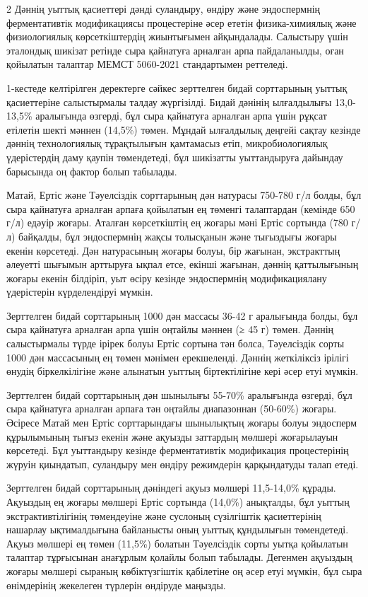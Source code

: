 \begin{multicols}{2}
Дәннің уыттық қасиеттері дәнді суландыру, өндіру және эндоспермнің
ферментативтік модификациясы процестеріне әсер ететін физика-химиялық
және физиологиялық көрсеткіштердің жиынтығымен айқындалады. Салыстыру
үшін эталондық шикізат ретінде сыра қайнатуға арналған арпа
пайдаланылды, оған қойылатын талаптар МЕМСТ 5060-2021 стандартымен
реттеледі.

1-кестеде келтірілген деректерге сәйкес зерттелген бидай сорттарының
уыттық қасиеттеріне салыстырмалы талдау жүргізілді. Бидай дәнінің
ылғалдылығы 13,0-13,5\% аралығында өзгерді, бұл сыра қайнатуға арналған
арпа үшін рұқсат етілетін шекті мәннен (14,5\%) төмен. Мұндай ылғалдылық
деңгейі сақтау кезінде дәннің технологиялық тұрақтылығын қамтамасыз
етіп, микробиологиялық үдерістердің даму қаупін төмендетеді, бұл
шикізатты уыттандыруға дайындау барысында оң фактор болып табылады.

Матай, Ертіс және Тәуелсіздік сорттарының дән натурасы 750-780 г/л
болды, бұл сыра қайнатуға арналған арпаға қойылатын ең төменгі
талаптардан (кемінде 650 г/л) едәуір жоғары. Аталған көрсеткіштің ең
жоғары мәні Ертіс сортында (780 г/л) байқалды, бұл эндоспермнің жақсы
толысқанын және тығыздығы жоғары екенін көрсетеді. Дән натурасының
жоғары болуы, бір жағынан, экстракттың әлеуетті шығымын арттыруға ықпал
етсе, екінші жағынан, дәннің қаттылығының жоғары екенін білдіріп, уыт
өсіру кезінде эндоспермнің модификациялану үдерістерін күрделендіруі
мүмкін.

Зерттелген бидай сорттарының 1000 дән массасы 36-42 г аралығында болды,
бұл сыра қайнатуға арналған арпа үшін оңтайлы мәннен (≥ 45 г) төмен.
Дәннің салыстырмалы түрде ірірек болуы Ертіс сортына тән болса,
Тәуелсіздік сорты 1000 дән массасының ең төмен мәнімен ерекшеленді.
Дәннің жеткіліксіз ірілігі өнудің біркелкілігіне және алынатын уыттың
біртектілігіне кері әсер етуі мүмкін.

Зерттелген бидай сорттарының дән шынылығы 55-70\% аралығында өзгерді,
бұл сыра қайнатуға арналған арпаға тән оңтайлы диапазоннан (50-60\%)
жоғары. Әсіресе Матай мен Ертіс сорттарындағы шынылықтың жоғары болуы
эндосперм құрылымының тығыз екенін және ақуызды заттардың мөлшері
жоғарылауын көрсетеді. Бұл уыттандыру кезінде ферментативтік модификация
процестерінің жүруін қиындатып, суландыру мен өндіру режимдерін
қарқындатуды талап етеді.

Зерттелген бидай сорттарының дәніндегі ақуыз мөлшері 11,5-14,0\% құрады.
Ақуыздың ең жоғары мөлшері Ертіс сортында (14,0\%) анықталды, бұл уыттың
экстрактивтілігінің төмендеуіне және суслоның сүзілгіштік қасиеттерінің
нашарлау ықтималдығына байланысты оның уыттық құндылығын төмендетеді.
Ақуыз мөлшері ең төмен (11,5\%) болатын Тәуелсіздік сорты уытқа
қойылатын талаптар тұрғысынан анағұрлым қолайлы болып табылады. Дегенмен
ақуыздың жоғары мөлшері сыраның көбіктүзгіштік қабілетіне оң әсер етуі
мүмкін, бұл сыра өнімдерінің жекелеген түрлерін өндіруде маңызды.


\end{multicols}
